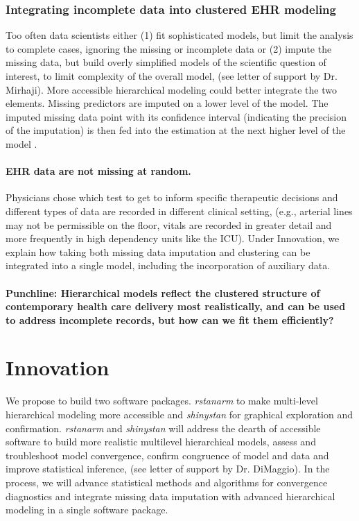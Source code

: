 \documentclass[11pt,notitlepage]{article}
\begin{document}
\section*{Integrating incomplete data into clustered EHR modeling}
Too often data scientists either (1) fit sophisticated models, but limit the analysis 
to complete cases, ignoring the missing or incomplete data or (2) impute the missing 
data, but build overly simplified models of the scientific question of interest, 
to limit complexity of the overall model, (see letter of support by Dr. Mirhaji). 
More accessible hierarchical modeling could better integrate the two elements. 
Missing predictors are imputed on a lower level of the model. The imputed missing 
data point with its confidence interval (indicating the precision of the imputation) 
is then fed into the estimation at the next higher level of the model
 \cite{Gelman2001imputation}. 

\subsection*{EHR data are not missing at random.} Physicians chose which test to get 
to inform specific therapeutic decisions and different types of data are recorded 
in different clinical setting, (e.g., arterial lines may not be permissible on the 
floor, vitals are recorded in greater detail and more frequently in high dependency 
units like the ICU). Under Innovation, we explain  how taking both missing data 
imputation and clustering can be integrated into a single model, including 
the incorporation of auxiliary data.  

\subsection*{Punchline: Hierarchical models reflect the clustered structure of contemporary health care delivery most realistically, and can be used to address incomplete records, but how can we fit them efficiently?}

\part*{Innovation}

We propose to build two software packages. \textit{rstanarm} to make 
multi-level hierarchical modeling more accessible and \textit{shinystan} 
for graphical exploration and confirmation. \textit{rstanarm} and 
\textit{shinystan} will address the dearth of accessible software 
to build more realistic multilevel hierarchical models, assess and 
troubleshoot model convergence, confirm congruence of model and data 
and improve statistical inference, (see letter of support by Dr. DiMaggio). 
In the process, we will advance statistical methods and algorithms for 
convergence diagnostics and integrate missing data imputation with 
advanced hierarchical modeling in a single software package.  
\end{document}
